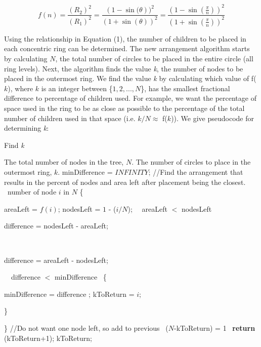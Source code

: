 \documentclass[10pt,psfig]{article}
\begin{document}
{\begin{equation}
f(n) = \frac{(R_{2})^{2}}{(R_{1})^{2}} = \frac{(1-\sin{(\theta}))^{2}}{(1+\sin{(\theta)})^{2}} = \frac{(1-\sin{(\frac{\pi}{n})})^{2}}{(1+\sin{(\frac{\pi}{n})})^{2}}
\end{equation}
\label{rings_eq}

Using the relationship in Equation (1), the number of children to be placed in each concentric ring can be determined.
The new arrangement algorithm starts by calculating $N$, the total number of circles to be placed in the entire circle (all ring levels).
Next, the algorithm finds the value {\em k}, the number of nodes to be placed in the outermost ring.  
We find the value {\em k} by calculating which value of f($k$), where $k$ is an integer between \{$1,2,...,N$\}, has the smallest fractional difference to percentage of children used.
For example, we want the percentage of space used in the ring to be as close as possible to the percentage of the total number of children used in that space (i.e. $k/N \approx$ f($k$)).
We give pseudocode for determining {\em k}:

\begin{Algorithm} {Find {\em k}} {\sf
\vspace*{10pt}
 The total number of nodes in the tree, $N$.
 The number of circles to place in the outermost ring, $k$.
\vspace*{10pt}
\row minDifference = $INFINITY$;
\vspace*{10pt}
\row //Find the arrangement that results in the percent of nodes and area left after placement being the closest.
\row  \cforeach\ number of node $i$ in $N$ \{
\begin{nested}
\row areaLeft = $f(i)$;
\row nodesLeft = $1$ - ($i/N$);
\vspace*{10pt}
\row \cif\ \ccbeg\ areaLeft $<$ nodesLeft \ccend\ \cthen\ 
\begin{nested}
\row difference = nodesLeft - areaLeft;
\end{nested}
\row \celse\
\begin{nested}
\row difference = areaLeft - nodesLeft;
\end{nested}
\vspace*{10pt}
\row \cif\ \ccbeg\ difference $<$ minDifference \ccend\  \{
\begin{nested} 
\row minDifference = difference ;
\row kToReturn = $i$;
\end{nested}
\row \}
\end{nested}
\row    \}
\row //Do not want one node left, so add to previous
\row \cif\ ($N$-kToReturn) = 1 \cthen\ {\bf return} (kToReturn+1);
\vspace*{10pt}
\row {\bf return} kToReturn;
} %
\end{Algorithm}


}
\end{document}
